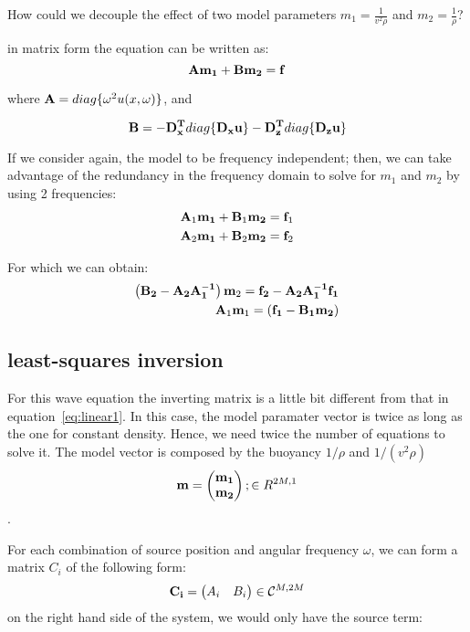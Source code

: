 \documentclass[10pt]{article}
\begin{document}
How could we decouple the effect of two model parameters $m_1 = \frac{1}{v^2\rho}$ and $m_2 = \frac{1}{\rho}$?


in matrix form the equation can be written as:
\begin{equation}
  {\bf A} {\bf m_1} + {\bf B} {\bf m_2} = {\bf f}
\end{equation}

where ${\bf A} = diag\{\omega^2 u(x,\omega)\}$, and 

\begin{equation}
 {\bf B} = -{\bf D_x^T}{ diag\{\bf D_x u\}} - {\bf D_z^T}{ diag\{\bf D_z u\}} 
\end{equation}

If we consider again, the model to be frequency independent; then, we can take advantage of the 
redundancy in the frequency domain to solve for $m_1$ and $m_2$ by using 2 frequencies:
\begin{align}
  {\bf A}_1 {\bf m_1} + {\bf B}_1 {\bf m_2} = {\bf f}_1 \\
  {\bf A}_2 {\bf m_1} + {\bf B}_2 {\bf m_2} = {\bf f}_2
\end{align}

For which we can obtain:
\begin{align}
  \left( {\bf B_2}-{\bf A_2}{\bf A_1^{-1}} \right) {\bf m}_2 = {\bf f_2} -{\bf A_2}{\bf A_1^{-1} f_1} \\
 {\bf A}_1 {\bf m}_1 = ({\bf f_1}-{\bf B_1 m_2}) 
\end{align}




\subsection{least-squares inversion}
  For this wave equation the inverting matrix is a little bit different from that in equation~\ref{eq:linear1}.
In this case, the model paramater vector is twice as long as the one for constant density. Hence, we 
need twice the number of equations to solve it. The model vector is composed by the buoyancy $1/\rho$ and 
 $1/(v^2\rho)$ 
\[
  {\bf m} = 
 \begin{pmatrix}
  {\bf m_1}     \\
  {\bf m_2}   
 \end{pmatrix};
\in R^{2M,1}
\].


For each combination of source position and angular frequency $\omega$, we can form a matrix $C_i$ of the 
following form:
\[
 {\bf C_i } =  
 \begin{pmatrix}
 A_i & B_i 
 \end{pmatrix}  \in \mathcal{C}^{M,2M} 
\]
on the right hand side of the system, we would only have the source term:
\end{document}
